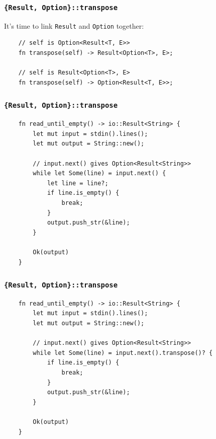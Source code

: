 \documentclass[aspectratio=1610,t]{beamer}
\begin{document}

\begin{frame}[fragile]
\frametitle{\texttt{\{Result, Option\}::transpose}}
It's time to link \texttt{Result} and \texttt{Option} together:

\begin{verbatim}
    // self is Option<Result<T, E>>
    fn transpose(self) -> Result<Option<T>, E>;

    // self is Result<Option<T>, E>
    fn transpose(self) -> Option<Result<T, E>>;
\end{verbatim}
\end{frame}


\begin{frame}[fragile,c]
\frametitle{\texttt{\{Result, Option\}::transpose}}
\begin{verbatim}
    fn read_until_empty() -> io::Result<String> {
        let mut input = stdin().lines();
        let mut output = String::new();

        // input.next() gives Option<Result<String>>
        while let Some(line) = input.next() {
            let line = line?;
            if line.is_empty() {
                break;
            }
            output.push_str(&line);
        }

        Ok(output)
    }
\end{verbatim}
\end{frame}


\begin{frame}[fragile,c]
\frametitle{\texttt{\{Result, Option\}::transpose}}
\begin{verbatim}
    fn read_until_empty() -> io::Result<String> {
        let mut input = stdin().lines();
        let mut output = String::new();

        // input.next() gives Option<Result<String>>
        while let Some(line) = input.next().transpose()? {
            if line.is_empty() {
                break;
            }
            output.push_str(&line);
        }

        Ok(output)
    }
\end{verbatim}
\end{frame}

\end{document}
